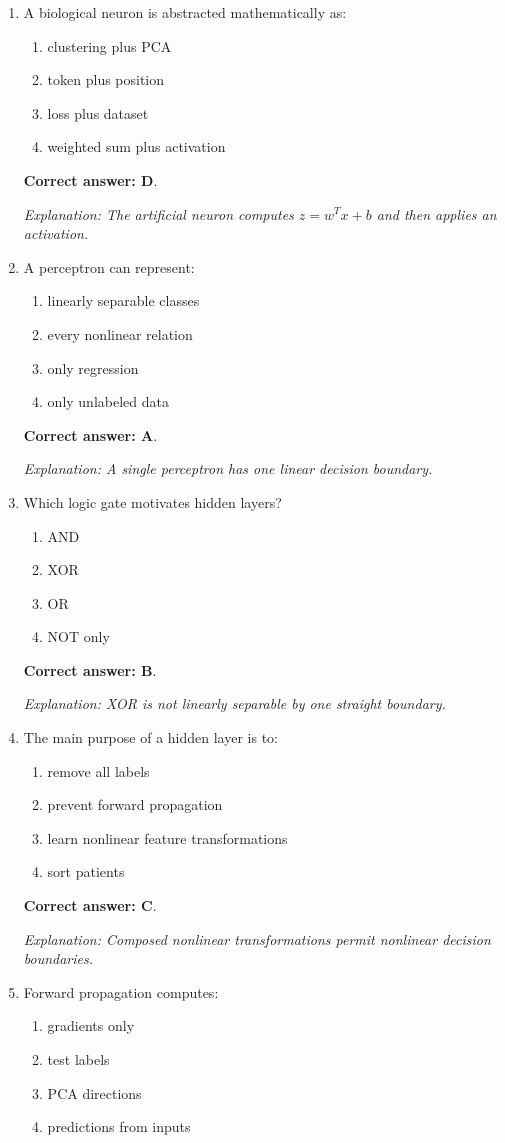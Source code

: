 \documentclass[10pt,a4paper]{article}
\newcommand{\ans}[1]{\par\textbf{Correct answer: #1}}
\newcommand{\expn}[1]{\par\textit{Explanation: #1}}
\begin{document}
\begin{enumerate}[label=\textbf{\arabic*.},itemsep=4pt]
\ans{C}. \expn{Similar scales can improve optimization and prevent one feature from dominating numerically.}
\item A biological neuron is abstracted mathematically as:
\begin{enumerate}[label=\Alph*.,itemsep=0pt]\item clustering plus PCA\item token plus position\item loss plus dataset\item weighted sum plus activation\end{enumerate}
\ans{D}. \expn{The artificial neuron computes $z=w^Tx+b$ and then applies an activation.}
\item A perceptron can represent:
\begin{enumerate}[label=\Alph*.,itemsep=0pt]\item linearly separable classes\item every nonlinear relation\item only regression\item only unlabeled data\end{enumerate}
\ans{A}. \expn{A single perceptron has one linear decision boundary.}
\item Which logic gate motivates hidden layers?
\begin{enumerate}[label=\Alph*.,itemsep=0pt]\item AND\item XOR\item OR\item NOT only\end{enumerate}
\ans{B}. \expn{XOR is not linearly separable by one straight boundary.}
\item The main purpose of a hidden layer is to:
\begin{enumerate}[label=\Alph*.,itemsep=0pt]\item remove all labels\item prevent forward propagation\item learn nonlinear feature transformations\item sort patients\end{enumerate}
\ans{C}. \expn{Composed nonlinear transformations permit nonlinear decision boundaries.}
\item Forward propagation computes:
\begin{enumerate}[label=\Alph*.,itemsep=0pt]\item gradients only\item test labels\item PCA directions\item predictions from inputs\end{enumerate}

\end{enumerate}
\end{document}
